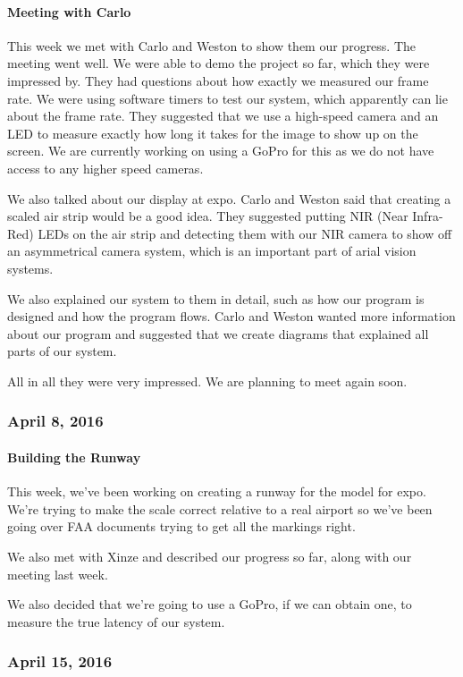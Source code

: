 \paragraph{Meeting with Carlo}
This week we met with Carlo and Weston to show them our progress. The meeting went well. We were able to demo the project so far, which they were impressed by. They had questions about how exactly we measured our frame rate. We were using software timers to test our system, which apparently can lie about the frame rate. They suggested that we use a high-speed camera and an LED to measure exactly how long it takes for the image to show up on the screen. We are currently working on using a GoPro for this as we do not have access to any higher speed cameras.
\par
We also talked about our display at expo. Carlo and Weston said that creating a scaled air strip would be a good idea. They suggested putting NIR (Near Infra-Red) LEDs on the air strip and detecting them with our NIR camera to show off an asymmetrical camera system, which is an important part of arial vision systems.
\par
We also explained our system to them in detail, such as how our program is designed and how the program flows. Carlo and Weston wanted more information about our program and suggested that we create diagrams that explained all parts of our system.
\par
All in all they were very impressed. We are planning to meet again soon.\\

\subsubsection{April 8, 2016}
\paragraph{Building the Runway}
This week, we've been working on creating a runway for the model for expo. We're trying to make the scale correct relative to a real airport so we've been going over FAA documents trying to get all the markings right.
\par
We also met with Xinze and described our progress so far, along with our meeting last week.
\par
We also decided that we're going to use a GoPro, if we can obtain one, to measure the true latency of our system.\\

\subsubsection{April 15, 2016}
